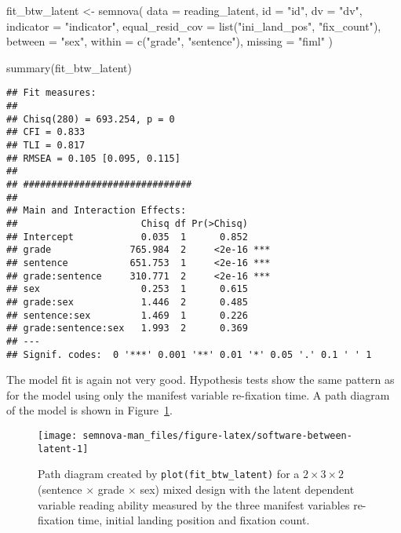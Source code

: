\documentclass[
]{book}
\newenvironment{Shaded}{\begin{snugshade}}{\end{snugshade}}
\newcommand{\AttributeTok}[1]{\textcolor[rgb]{0.77,0.63,0.00}{#1}}
\newcommand{\FunctionTok}[1]{\textcolor[rgb]{0.00,0.00,0.00}{#1}}
\newcommand{\NormalTok}[1]{#1}
\newcommand{\OtherTok}[1]{\textcolor[rgb]{0.56,0.35,0.01}{#1}}
\newcommand{\StringTok}[1]{\textcolor[rgb]{0.31,0.60,0.02}{#1}}
\begin{document}
\begin{Shaded}
\begin{Highlighting}[]
\NormalTok{fit\_btw\_latent }\OtherTok{\textless{}{-}} \FunctionTok{semnova}\NormalTok{(}
    \AttributeTok{data =}\NormalTok{ reading\_latent,}
    \AttributeTok{id =} \StringTok{"id"}\NormalTok{, }
    \AttributeTok{dv =} \StringTok{"dv"}\NormalTok{,}
    \AttributeTok{indicator =} \StringTok{"indicator"}\NormalTok{,}
    \AttributeTok{equal\_resid\_cov =} \FunctionTok{list}\NormalTok{(}\StringTok{"ini\_land\_pos"}\NormalTok{, }\StringTok{"fix\_count"}\NormalTok{),}
    \AttributeTok{between =} \StringTok{"sex"}\NormalTok{,}
    \AttributeTok{within =} \FunctionTok{c}\NormalTok{(}\StringTok{"grade"}\NormalTok{, }\StringTok{"sentence"}\NormalTok{),}
    \AttributeTok{missing =} \StringTok{"fiml"}
\NormalTok{)}

\FunctionTok{summary}\NormalTok{(fit\_btw\_latent)}
\end{Highlighting}
\end{Shaded}

\begin{verbatim}
## Fit measures:
## 
## Chisq(280) = 693.254, p = 0
## CFI = 0.833
## TLI = 0.817
## RMSEA = 0.105 [0.095, 0.115]
## 
## ##############################
## 
## Main and Interaction Effects:
##                      Chisq df Pr(>Chisq)    
## Intercept            0.035  1      0.852    
## grade              765.984  2     <2e-16 ***
## sentence           651.753  1     <2e-16 ***
## grade:sentence     310.771  2     <2e-16 ***
## sex                  0.253  1      0.615    
## grade:sex            1.446  2      0.485    
## sentence:sex         1.469  1      0.226    
## grade:sentence:sex   1.993  2      0.369    
## ---
## Signif. codes:  0 '***' 0.001 '**' 0.01 '*' 0.05 '.' 0.1 ' ' 1
\end{verbatim}

The model fit is again not very good. Hypothesis tests show the same pattern as for the model using only the manifest variable re-fixation time. A path diagram of the model is shown in Figure~\ref{fig:software-between-latent}.

\begin{figure}

{\centering \texttt{[image: semnova-man\_files/figure-latex/software-between-latent-1]} 

}

\caption{Path diagram created by \texttt{plot(fit\_btw\_latent)} for a $2 \times 3 \times 2$ (sentence $\times$ grade $\times$ sex) mixed design with the latent dependent variable reading ability measured by the three manifest variables re-fixation time, initial landing position and fixation count.}\label{fig:software-between-latent}
\end{figure}
\end{document}
